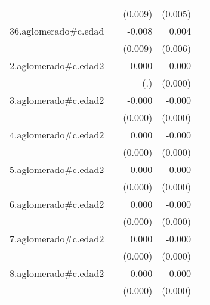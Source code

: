 {\begin{longtable}{l*{4}{D{.}{.}{-1}}}
            &                     &     (0.009)         &     (0.005)         &                     \\
\addlinespace
36.aglomerado#c.edad&                     &      -0.008         &       0.004         &                     \\
            &                     &     (0.009)         &     (0.006)         &                     \\
\addlinespace
2.aglomerado#c.edad2&                     &       0.000         &      -0.000\sym{**} &                     \\
            &                     &         (.)         &     (0.000)         &                     \\
\addlinespace
3.aglomerado#c.edad2&                     &      -0.000         &      -0.000\sym{**} &                     \\
            &                     &     (0.000)         &     (0.000)         &                     \\
\addlinespace
4.aglomerado#c.edad2&                     &       0.000         &      -0.000\sym{**} &                     \\
            &                     &     (0.000)         &     (0.000)         &                     \\
\addlinespace
5.aglomerado#c.edad2&                     &      -0.000         &      -0.000\sym{**} &                     \\
            &                     &     (0.000)         &     (0.000)         &                     \\
\addlinespace
6.aglomerado#c.edad2&                     &       0.000         &      -0.000\sym{*}  &                     \\
            &                     &     (0.000)         &     (0.000)         &                     \\
\addlinespace
7.aglomerado#c.edad2&                     &       0.000         &      -0.000         &                     \\
            &                     &     (0.000)         &     (0.000)         &                     \\
\addlinespace
8.aglomerado#c.edad2&                     &       0.000\sym{**} &       0.000\sym{*}  &                     \\
            &                     &     (0.000)         &     (0.000)         &                     \\

\end{longtable}}
